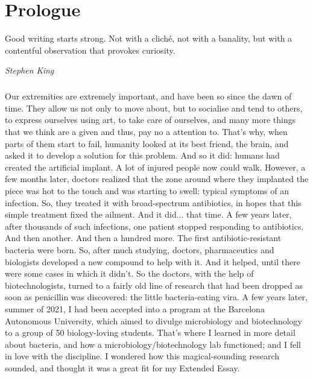 \chapter{Prologue}
\epigraph{Good writing starts strong. Not with a cliché, not with a banality, but with a contentful observation that provokes curiosity.}{\textit{Stephen King}}
\paragraph{}Our extremities are extremely important, and have been so since the dawn of time. They allow us not only to move about, but to socialise and tend to others, to express ourselves using art, to take care of ourselves, and many more things that we think are a given and thus, pay no a attention to. That's why, when parts  of them start to fail, humanity looked at its best friend, the brain, and asked it to develop a solution for this problem. And so it did: humans had created the artificial implant. A lot of injured people now could walk. However, a few months later, doctors realized that the zone around where they implanted the piece was hot to the touch and was starting to swell: typical symptoms of an infection. So, they treated it with broad-spectrum antibiotics, in hopes that this simple treatment fixed the ailment. And it did... that time. A few years later, after thousands of such infections, one patient stopped responding to antibiotics. And then another. And then a hundred more. The first antibiotic-resistant bacteria were born. So, after much studying, doctors, pharmaceutics and biologists developed a new compound to help with it. And it helped, until there were some cases in which it didn't. So the doctors, with the help of biotechnologists, turned to a fairly old line of research that had been dropped as soon as penicillin was discovered: the little bacteria-eating vira.\newline
A few years later, summer of 2021, I had been accepted into a program at the Barcelona Autonomous University, which aimed to divulge microbiology and biotechnology to a group of 50 biology-loving students. That's where I learned in more detail about bacteria, and how a microbiology/biotechnology lab functioned; and I fell in love with the discipline. I wondered how this magical-sounding research sounded, and thought it was a great fit for my Extended Essay.

